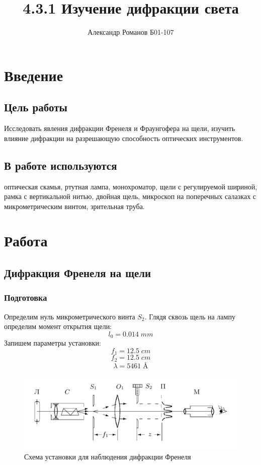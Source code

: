 \documentclass{article}
\author{Александр Романов Б01-107}
\date{}
\title{4.3.1 Изучение дифракции света}
\begin{document}
\maketitle
\section{Введение}
\subsection{Цель работы}
Исследовать явления дифракции Френеля и Фраунгофера на щели, изучить влияние дифракции
на разрешающую способность оптических инструментов.
\subsection{В работе используются}
оптическая скамья, ртутная лампа, монохроматор, щели с регулируемой шириной, рамка с вертикальной
нитью, двойная щель, микроскоп на поперечных салазках с микрометрическим винтом, зрительная труба.
\section{Работа}
\subsection{Дифракция Френеля на щели}
\subsubsection{Подготовка}
Определим нуль микрометрического винта \(S_2\). Глядя сквозь щель на лампу определим момент открытия щели:
\[ l_0 = 0.014\;mm \]
Запишем параметры установки:
\[ f_1 = 12.5\;cm \]
\[ f_2 = 12.5\;cm \]
\[ \lambda = 5461\;\text{\AA} \]


\begin{figure}[H]
  \centering
  \includegraphics[width=\textwidth]{frnl-scheme.png}
  \caption{Схема установки для наблюдения дифракции Френеля}
  \label{fig:frnl}
\end{figure}
\end{document}
